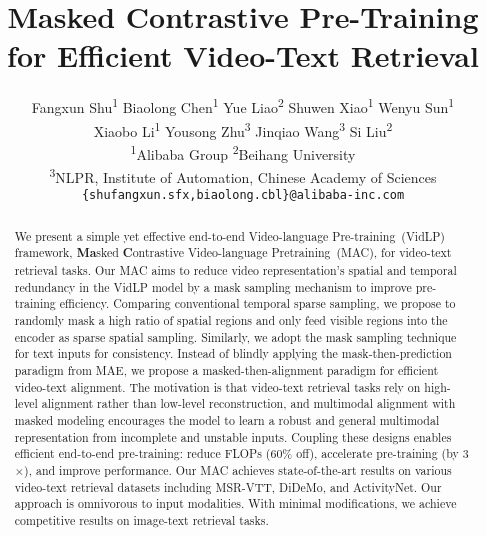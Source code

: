 \documentclass[10pt,twocolumn,letterpaper]{article}
\begin{document}
\title{Masked Contrastive Pre-Training for Efficient Video-Text Retrieval}

\author{  
  Fangxun Shu\textsuperscript{\rm 1} \quad Biaolong Chen\textsuperscript{\rm 1} \quad Yue Liao\textsuperscript{\rm 2} \quad Shuwen Xiao\textsuperscript{\rm 1} \quad Wenyu Sun\textsuperscript{\rm 1}  \\ Xiaobo Li\textsuperscript{\rm 1} \quad Yousong Zhu\textsuperscript{\rm 3} \quad Jinqiao Wang\textsuperscript{\rm 3}  \quad Si Liu\textsuperscript{\rm 2} \\
   \textsuperscript{\rm 1}Alibaba Group \quad
  \textsuperscript{\rm 2}Beihang University \quad
    \\ \textsuperscript{\rm 3}NLPR, Institute of Automation,
Chinese Academy of Sciences
 \\ {\tt\small \{shufangxun.sfx,biaolong.cbl\}@alibaba-inc.com}
}
\maketitle

\begin{abstract}
   We present a simple yet effective end-to-end Video-language Pre-training~(VidLP) framework, \textbf{Ma}sked \textbf{C}ontrastive Video-language Pretraining~(MAC), for video-text retrieval tasks. Our MAC aims to reduce video representation's spatial and temporal redundancy in the VidLP model by a mask sampling mechanism to improve pre-training efficiency. Comparing conventional temporal sparse sampling, we propose to randomly mask a high ratio of spatial regions and only feed visible regions into the encoder as sparse spatial sampling. Similarly, we adopt the mask sampling technique for text inputs for consistency. Instead of blindly applying the mask-then-prediction paradigm from MAE, we propose a masked-then-alignment paradigm for efficient video-text alignment. The motivation is that video-text retrieval tasks rely on high-level alignment rather than low-level reconstruction, and multimodal alignment with masked modeling encourages the model to learn a robust and general multimodal representation from incomplete and unstable inputs. Coupling these designs enables efficient end-to-end pre-training: reduce FLOPs (60\% off), accelerate pre-training (by 3$\times$), and improve performance. Our MAC achieves state-of-the-art results on various video-text retrieval datasets including MSR-VTT, DiDeMo, and ActivityNet. Our approach is omnivorous to input modalities. With minimal modifications, we achieve competitive results on image-text retrieval tasks.

\end{abstract}
\end{document}
